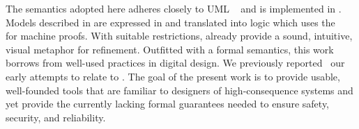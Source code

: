 The semantics adopted here adheres closely to UML \Statecharts~\cite{Alexandre} and is implemented in \iUMLB.
Models described in \Statecharts are expressed in \SCXML and translated into \EventB logic which uses the \Rodin~\cite{abrial10:_rodin} for machine proofs.
With suitable restrictions, \Statecharts already provide a sound, intuitive, visual metaphor for refinement. 
Outfitted with a formal semantics, this work borrows from well-used \Statechart practices in digital design.  
We previously reported~\cite{Morris_2016} our early attempts to relate \Statecharts to \EventB. 
The goal of the present work is to provide usable, well-founded tools that are familiar to designers of high-consequence systems and yet provide the currently lacking formal guarantees needed to ensure safety, security, and reliability.

%



